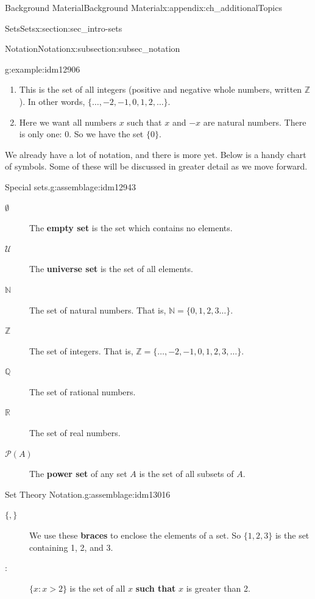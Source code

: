 \documentclass[oneside,10pt,]{book}
\newcommand{\terminology}[1]{\textbf{#1}}
\numberwithin{equation}{chapter}
\def\N{\mathbb N}
\def\Z{\mathbb Z}
\def\Q{\mathbb Q}
\def\R{\mathbb R}
\def\U{\mathcal U}
\def\pow{\mathcal P}
\def\st{:}
\begin{document}
\begin{appendixptx}{Background Material}{}{Background Material}{}{}{x:appendix:ch_additionalTopics}
\begin{sectionptx}{Sets}{}{Sets}{}{}{x:section:sec_intro-sets}
\begin{subsectionptx}{Notation}{}{Notation}{}{}{x:subsection:subsec_notation}
\begin{example}{}{g:example:idm12906}
\begin{enumerate}
\item{}This is the set of all integers  (positive and negative whole numbers, written \(\Z\)). In other words, \(\{\ldots, -2, -1, 0, 1, 2, \ldots\}\).%
\item{}Here we want all numbers \(x\) such that \(x\) and \(-x\) are natural numbers. There is only one: 0. So we have the set \(\{0\}\).%
\end{enumerate}
%
\end{example}
We already have a lot of notation, and there is more yet. Below is a handy chart of symbols. Some of these will be discussed in greater detail as we move forward.%
\begin{assemblage}{Special sets.}{g:assemblage:idm12943}%
%
\begin{description}
\item[{\(\emptyset\)}]The \terminology{empty set} is the set which contains no elements. \label{g:notation:idm12952}  %
\item[{\(\U\)}]The \terminology{universe set} is the set of all elements. \label{g:notation:idm12962}%
\item[{\(\N\)}]The set of natural numbers. That is, \(\N =
\{0, 1, 2, 3\ldots\}\).\label{g:notation:idm12970} %
\item[{\(\Z\)}]The set of integers. That is, \(\Z = \{\ldots, -2, -1, 0, 1, 2, 3, \ldots\}\).  \label{g:notation:idm12982}%
\item[{\(\Q\)}]The set of rational numbers.  \label{g:notation:idm12989} %
\item[{\(\R\)}]The set of real numbers.      \label{g:notation:idm13000}%
\item[{\(\pow(A)\)}]The \terminology{power set} of any set \(A\) is the set of all subsets of \(A\).\label{g:notation:idm13012}%
\end{description}
%
\end{assemblage}
\begin{assemblage}{Set Theory Notation.}{g:assemblage:idm13016}%
%
\begin{description}
\item[{\(\{, \}\)}]We use these \terminology{braces} to enclose the elements of a set. So \(\{1,2,3\}\) is the set containing 1, 2, and 3.\label{g:notation:idm13026}%
\item[{\(\st\)}]\(\{x \st x > 2\}\) is the set of all \(x\) \terminology{such that} \(x\) is greater than 2.\label{g:notation:idm13037}%

\end{description}
\end{assemblage}
\end{subsectionptx}
\end{sectionptx}
\end{appendixptx}
\end{document}
